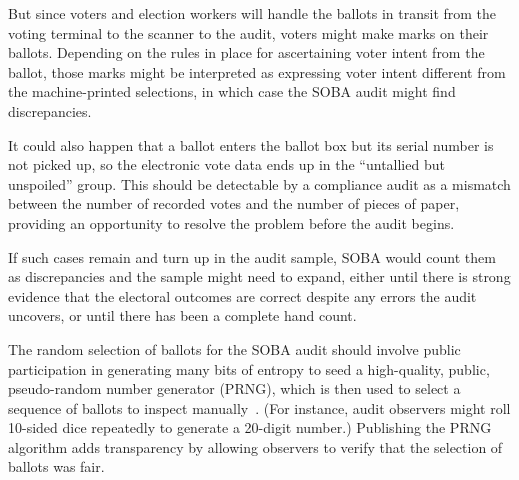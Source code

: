 But since voters and election workers will handle the ballots in transit from the voting terminal 
to the scanner to the audit, voters might make marks on their ballots.
Depending on the rules in place for ascertaining voter intent from the ballot,
those marks might be interpreted as expressing voter intent different from the
machine-printed selections, in which case the SOBA audit might find discrepancies.

It could also happen that a ballot enters the ballot box but its serial number is not
picked up, so the electronic vote data ends up in the ``untallied but unspoiled'' group.
This should be detectable by a compliance audit \cite{benalohEtal11,lindemanStark12,starkWagner12} 
as a mismatch between the number of recorded votes and the number of pieces of paper,
providing an opportunity to resolve the problem before the audit begins.

If such cases remain and turn up in the audit sample, SOBA would count them as discrepancies 
and the sample might need to expand, either
until there is strong evidence that the electoral outcomes are correct despite any errors the audit
uncovers, or until there has been a complete hand count.

The random selection of ballots for the SOBA audit should involve public participation in
generating many bits of entropy to seed a high-quality, public, pseudo-random 
number generator (PRNG), which is then used to select a sequence of
ballots to inspect manually~\cite{lindemanStark12}.
(For instance, audit observers might roll 10-sided dice repeatedly to generate a 20-digit number.)
Publishing the PRNG algorithm adds transparency by allowing observers to verify
that the selection of ballots was fair.



